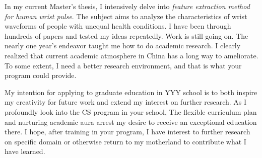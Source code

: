 \documentclass[a4paper]{article}
\begin{document}
In my current Master's thesis, I intensively delve into
\textit{feature extraction method for human wrist pulse}. The subject
aims to analyze the characteristics of wrist waveforms of people with
unequal health conditions. I have been through hundreds of papers and
tested my ideas repeatedly. Work is still going on. The nearly one
year's endeavor taught me how to do academic research. I clearly 
realized that current academic atmosphere in China has a long way to
ameliorate. To some extent, I need a better research environment, and that
is what your program could provide.


My intention for applying to graduate education in YYY school is to
both inspire my creativity for future work and extend my interest on
further research. As I profoundly look into the CS program in your
school, The flexible curriculum plan and nurturing academic aura
arrest my desire to receive an exceptional education there. I hope,
after training in your program, I have interest to further research on
specific domain or otherwise return to my motherland to contribute
what I have learned. 
\end{document}
